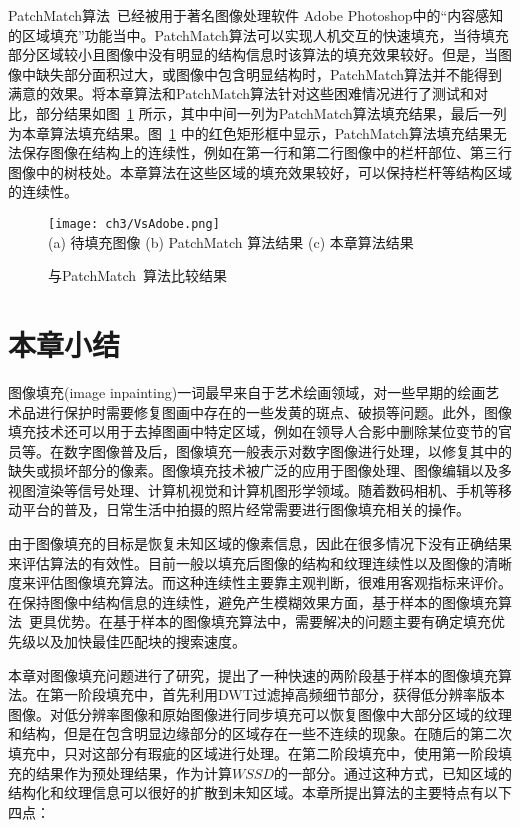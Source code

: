 PatchMatch算法~\cite{Barnes:2009}已经被用于著名图像处理软件 Adobe Photoshop中的``内容感知的区域填充''功能当中。PatchMatch算法可以实现人机交互的快速填充，当待填充部分区域较小且图像中没有明显的结构信息时该算法的填充效果较好。但是，当图像中缺失部分面积过大，或图像中包含明显结构时，PatchMatch算法并不能得到满意的效果。将本章算法和PatchMatch算法针对这些困难情况进行了测试和对比，部分结果如图~\ref{ch3:fig:10} 所示，其中中间一列为PatchMatch算法填充结果，最后一列为本章算法填充结果。图~\ref{ch3:fig:10} 中的红色矩形框中显示，PatchMatch算法填充结果无法保存图像在结构上的连续性，例如在第一行和第二行图像中的栏杆部位、第三行图像中的树枝处。本章算法在这些区域的填充效果较好，可以保持栏杆等结构区域的连续性。
\begin{figure}[!htbp]
\begin{center}
  \texttt{[image: ch3/VsAdobe.png]}
 \\
  (a) 待填充图像 (b) PatchMatch 算法\cite{Barnes:2009}结果    (c) 本章算法结果
\end{center}
\caption{与PatchMatch~\cite{Barnes:2009}算法比较结果}
\label{ch3:fig:10}       %
\end{figure}\par

 \section{本章小结}
 \label{cha3:conclusions}
图像填充(image inpainting)一词最早来自于艺术绘画领域，对一些早期的绘画艺术品进行保护时需要修复图画中存在的一些发黄的斑点、破损等问题。此外，图像填充技术还可以用于去掉图画中特定区域，例如在领导人合影中删除某位变节的官员等。在数字图像普及后，图像填充一般表示对数字图像进行处理，以修复其中的缺失或损坏部分的像素。图像填充技术被广泛的应用于图像处理、图像编辑以及多视图渲染等信号处理、计算机视觉和计算机图形学领域。随着数码相机、手机等移动平台的普及，日常生活中拍摄的照片经常需要进行图像填充相关的操作。\par
由于图像填充的目标是恢复未知区域的像素信息，因此在很多情况下没有正确结果来评估算法的有效性。目前一般以填充后图像的结构和纹理连续性以及图像的清晰度来评估图像填充算法。而这种连续性主要靠主观判断，很难用客观指标来评价。在保持图像中结构信息的连续性，避免产生模糊效果方面，基于样本的图像填充算法~\cite{Criminisi04regionfilling,Xu:2010}更具优势。在基于样本的图像填充算法中，需要解决的问题主要有确定填充优先级以及加快最佳匹配块的搜索速度。\par
本章对图像填充问题进行了研究，提出了一种快速的两阶段基于样本的图像填充算法。在第一阶段填充中，首先利用DWT过滤掉高频细节部分，获得低分辨率版本图像。对低分辨率图像和原始图像进行同步填充可以恢复图像中大部分区域的纹理和结构，但是在包含明显边缘部分的区域存在一些不连续的现象。在随后的第二次填充中，只对这部分有瑕疵的区域进行处理。在第二阶段填充中，使用第一阶段填充的结果作为预处理结果，作为计算\(WSSD\)的一部分。通过这种方式，已知区域的结构化和纹理信息可以很好的扩散到未知区域。本章所提出算法的主要特点有以下四点：

